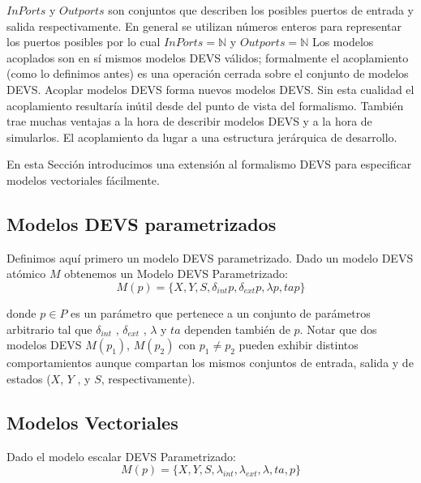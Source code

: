 \documentclass[a4paper,	11pt]{report}
\begin{document}
$InPorts$ y $Outports$ son conjuntos que describen los posibles puertos de entrada y salida respectivamente. En general se utilizan números enteros para representar los puertos posibles por lo cual $InPorts = \mathbb{N}$ y $Outports = \mathbb{N}$ Los modelos acoplados son en sí mismos modelos DEVS válidos; formalmente el acoplamiento (como lo definimos antes) es una operación cerrada sobre el conjunto de modelos DEVS. Acoplar modelos DEVS forma nuevos modelos DEVS. Sin esta cualidad el acoplamiento resultaría inútil desde del punto de vista del formalismo. También trae muchas ventajas a la hora de describir modelos DEVS y a la hora de simularlos. El acoplamiento da lugar a una estructura jerárquica de desarrollo.

En esta Sección introducimos una extensión al formalismo DEVS para especificar modelos vectoriales fácilmente.

\subsection{Modelos DEVS parametrizados}
Definimos aquí primero un modelo DEVS parametrizado. Dado un modelo DEVS atómico $M$ obtenemos un Modelo DEVS Parametrizado:
\begin{equation}
M (p) = \{X, Y, S, \delta_{int} p , \delta_{ext} p ,\lambda p , ta p\}
\end{equation}

donde $p \in P$ es un parámetro que pertenece a un conjunto de parámetros arbitrario tal que $\delta_{int}$ , $\delta_{ext}$ , $\lambda$ y $ta$ dependen también de $p$.
Notar que dos modelos DEVS $M (p_1 )$, $M (p_2 )$ con $p_1 \neq p_2$ pueden exhibir distintos comportamientos aunque compartan los mismos conjuntos de entrada, salida y de estados ($X$, $Y$ , y $S$, respectivamente).

\subsection{Modelos Vectoriales}
Dado el modelo escalar DEVS Parametrizado:
\begin{equation}
M (p) = \{X, Y, S, \lambda_{int} , \lambda_{ext} , \lambda, ta, p\}
\end{equation}
\end{document}
